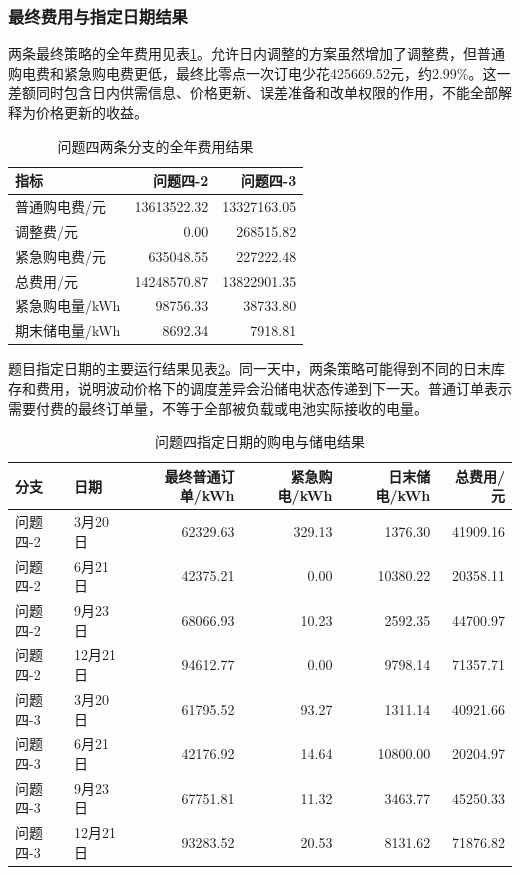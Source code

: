 \subsubsection{最终费用与指定日期结果}

两条最终策略的全年费用见表\ref{tab:q4result}。允许日内调整的方案虽然增加了调整费，但普通购电费和紧急购电费更低，最终比零点一次订电少花425669.52元，约2.99\%。这一差额同时包含日内供需信息、价格更新、误差准备和改单权限的作用，不能全部解释为价格更新的收益。

\begin{table}[htbp]
\centering\small
\caption{问题四两条分支的全年费用结果}
\label{tab:q4result}
\begin{tabular}{lrr}
\toprule
指标 & 问题四-2 & 问题四-3 \\
\midrule
普通购电费/元 & 13613522.32 & 13327163.05 \\
调整费/元 & 0.00 & 268515.82 \\
紧急购电费/元 & 635048.55 & 227222.48 \\
总费用/元 & 14248570.87 & 13822901.35 \\
紧急购电量/kWh & 98756.33 & 38733.80 \\
期末储电量/kWh & 8692.34 & 7918.81 \\
\bottomrule
\end{tabular}
\end{table}

题目指定日期的主要运行结果见表\ref{tab:q4days}。同一天中，两条策略可能得到不同的日末库存和费用，说明波动价格下的调度差异会沿储电状态传递到下一天。普通订单表示需要付费的最终订单量，不等于全部被负载或电池实际接收的电量。

\begin{table}[htbp]
\centering\footnotesize
\caption{问题四指定日期的购电与储电结果}
\label{tab:q4days}
\begin{tabular}{llrrrr}
\toprule
分支 & 日期 & 最终普通订单/kWh & 紧急购电/kWh & 日末储电/kWh & 总费用/元 \\
\midrule
问题四-2 & 3月20日 & 62329.63 & 329.13 & 1376.30 & 41909.16 \\
问题四-2 & 6月21日 & 42375.21 & 0.00 & 10380.22 & 20358.11 \\
问题四-2 & 9月23日 & 68066.93 & 10.23 & 2592.35 & 44700.97 \\
问题四-2 & 12月21日 & 94612.77 & 0.00 & 9798.14 & 71357.71 \\
问题四-3 & 3月20日 & 61795.52 & 93.27 & 1311.14 & 40921.66 \\
问题四-3 & 6月21日 & 42176.92 & 14.64 & 10800.00 & 20204.97 \\
问题四-3 & 9月23日 & 67751.81 & 11.32 & 3463.77 & 45250.33 \\
问题四-3 & 12月21日 & 93283.52 & 20.53 & 8131.62 & 71876.82 \\
\bottomrule
\end{tabular}
\end{table}

